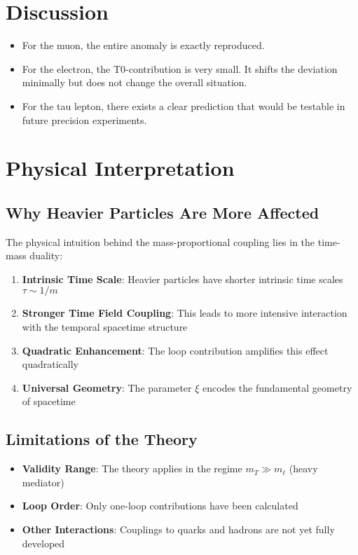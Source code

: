 \documentclass[12pt,a4paper]{article}
\theoremstyle{definition}
\begin{document}
	\section*{Discussion}
	\begin{itemize}
		\item For the muon, the entire anomaly is exactly reproduced.
		\item For the electron, the T0-contribution is very small. It shifts the deviation minimally but does not change the overall situation.
		\item For the tau lepton, there exists a clear prediction that would be testable in future precision experiments.
	\end{itemize}
	
	\section{Physical Interpretation}
	
	\subsection{Why Heavier Particles Are More Affected}
	
	The physical intuition behind the mass-proportional coupling lies in the time-mass duality:
	
	\begin{enumerate}
		\item \textbf{Intrinsic Time Scale}: Heavier particles have shorter intrinsic time scales $\tau \sim 1/m$
		\item \textbf{Stronger Time Field Coupling}: This leads to more intensive interaction with the temporal spacetime structure
		\item \textbf{Quadratic Enhancement}: The loop contribution amplifies this effect quadratically
		\item \textbf{Universal Geometry}: The parameter $\xi$ encodes the fundamental geometry of spacetime
	\end{enumerate}
	
	\subsection{Limitations of the Theory}
	
	\begin{itemize}
		\item \textbf{Validity Range}: The theory applies in the regime $m_T \gg m_\ell$ (heavy mediator)
		\item \textbf{Loop Order}: Only one-loop contributions have been calculated
		\item \textbf{Other Interactions}: Couplings to quarks and hadrons are not yet fully developed
	\end{itemize}
	
\end{document}

